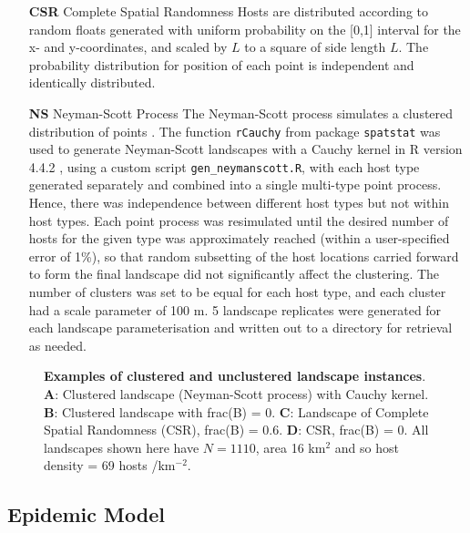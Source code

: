 \documentclass[11pt,letterpaper]{article}
\begin{document}
\begin{itemize}
\item[\textbf{CSR}] Complete Spatial Randomness 
\newline
\label{csr}
    Hosts are distributed according to random floats generated with uniform probability on the [0,1] interval for the x- and y-coordinates, and scaled by $L$ to a square of side length $L$. The probability distribution for position of each point is independent and identically distributed. 
    
\item[\textbf{NS}]  Neyman-Scott Process \label{ns}
\newline
    The Neyman-Scott process simulates a clustered distribution of points \cite{vandenBosch2024}. The function \texttt{rCauchy} from package \texttt{spatstat} \cite{Baddeley2015} was used to generate Neyman-Scott landscapes with a Cauchy kernel in R version 4.4.2 \cite{RCoreTeam2024}, using a custom script \texttt{gen\_neymanscott.R}, with each host type generated separately and combined into a single multi-type point process. Hence, there was independence between different host types but not within host types. Each point process was resimulated until the desired number of hosts for the given type was approximately reached (within a user-specified error of 1\%), so that random subsetting of the host locations carried forward to form the final landscape did not significantly affect the clustering. The number of clusters was set to be equal for each host type, and each cluster had a scale parameter of 100 m. 5 landscape replicates were generated for each landscape parameterisation and written out to a directory for retrieval as needed.
\end{itemize}

%
%

\begin{figure} 
	\centering
    
    \caption{   \label{landscapeexample} \textbf{Examples of clustered and unclustered landscape instances}. \textbf{A}: Clustered landscape (Neyman-Scott process) with Cauchy kernel. \textbf{B}: Clustered landscape with frac(B) = 0. \textbf{C}: Landscape of Complete Spatial Randomness (CSR), frac(B) = 0.6. \textbf{D}: CSR, frac(B) = 0.
    	 All landscapes shown here have $N = 1110$, area 16 km$^2$ and so host density = 69 hosts /km$^{-2}$.}
\end{figure}

\FloatBarrier
\subsection*{Epidemic Model}
\end{document}
